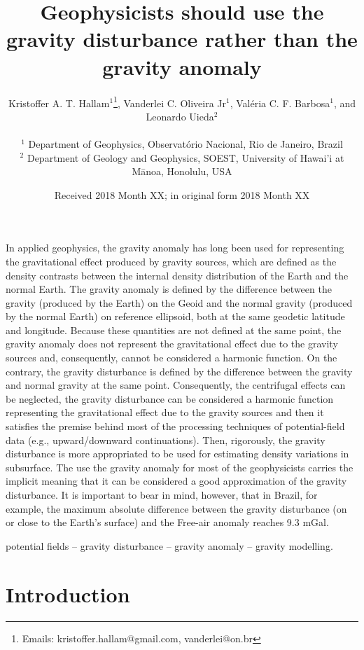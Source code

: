 \documentclass[extra]{gji}
\title[Gravity anomaly or gravity disturbance?]
      {Geophysicists should use the gravity disturbance rather than the gravity anomaly}
\author[Hallam et al.]{
\parbox{\linewidth}{%
    Kristoffer A. T. Hallam$^{1}$\thanks{Emails: kristoffer.hallam@gmail.com, vanderlei@on.br},
    Vanderlei C. Oliveira Jr$^1$,
    Val\'{e}ria C. F. Barbosa$^1$, and \linebreak Leonardo Uieda$^2$
    \vspace{0.3cm}
}%
    \\
    $^1$ Department of Geophysics, Observat\'{o}rio Nacional, Rio de Janeiro, Brazil \\
    $^2$ Department of Geology and Geophysics, SOEST, University of Hawai'i at M\={a}noa, Honolulu, USA
}
\date{Received 2018 Month XX; in original form 2018 Month XX}
\begin{document}
\label{firstpage}

\maketitle


\begin{summary}
 In applied geophysics, the gravity anomaly has long been used for representing the
 gravitational effect produced by gravity sources, which are defined as the density
 contrasts between the internal density distribution of the Earth and the normal Earth.
 The gravity anomaly is defined by the difference between the gravity (produced by the
 Earth) on the Geoid and the normal gravity (produced by the normal Earth)
 on reference ellipsoid, both at the same geodetic latitude and longitude.
 Because these quantities are not defined at the same point,
 the gravity anomaly does not represent the gravitational effect due to the gravity
 sources and, consequently, cannot be considered a harmonic function.
 On the contrary, the gravity disturbance is defined by the difference between
 the gravity and normal gravity at the same point. Consequently, the centrifugal
 effects can be neglected, the gravity disturbance can be considered a harmonic
 function representing the gravitational effect due to the gravity sources and then
 it satisfies the premise behind most of the processing techniques of potential-field
 data (e.g., upward/downward continuations). Then, rigorously, the gravity disturbance
 is  more appropriated to be used for estimating density variations in subsurface.
 The use the gravity anomaly for most of the geophysicists carries the
 implicit meaning that it can be considered a good approximation of the gravity
 disturbance. It is important to bear in mind, however, that in Brazil, for example,
 the maximum absolute difference between the gravity disturbance (on or close
 to the Earth’s surface) and the Free-air anomaly reaches 9.3 mGal.

\end{summary}

\begin{keywords}
 potential fields -- gravity disturbance -- gravity anomaly -- gravity modelling.
\end{keywords}


\section{Introduction}
\end{document}
